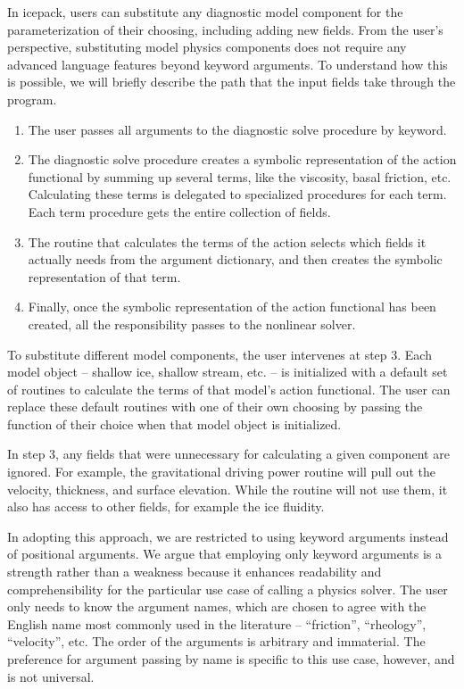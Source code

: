 \documentclass[journal abbreviation, manuscript]{copernicus}
\begin{document}
In icepack, users can substitute any diagnostic model component for the parameterization of their choosing, including adding new fields.
From the user's perspective, substituting model physics components does not require any advanced language features beyond keyword arguments.
To understand how this is possible, we will briefly describe the path that the input fields take through the program.
\begin{enumerate}
    \item The user passes all arguments to the diagnostic solve procedure by keyword.
    \item The diagnostic solve procedure creates a symbolic representation of the action functional by summing up several terms, like the viscosity, basal friction, etc.
        Calculating these terms is delegated to specialized procedures for each term.
        Each term procedure gets the entire collection of fields.
    \item The routine that calculates the terms of the action selects which fields it actually needs from the argument dictionary, and then creates the symbolic representation of that term.
    \item Finally, once the symbolic representation of the action functional has been created, all the responsibility passes to the nonlinear solver.
\end{enumerate}
To substitute different model components, the user intervenes at step 3.
Each model object -- shallow ice, shallow stream, etc. -- is initialized with a default set of routines to calculate the terms of that model's action functional.
The user can replace these default routines with one of their own choosing by passing the function of their choice when that model object is initialized.

In step 3, any fields that were unnecessary for calculating a given component are ignored.
For example, the gravitational driving power routine will pull out the velocity, thickness, and surface elevation.
While the routine will not use them, it also has access to other fields, for example the ice fluidity.

In adopting this approach, we are restricted to using keyword arguments instead of positional arguments.
We argue that employing only keyword arguments is a strength rather than a weakness because it enhances readability and comprehensibility for the particular use case of calling a physics solver.
The user only needs to know the argument names, which are chosen to agree with the English name most commonly used in the literature -- ``friction'', ``rheology'', ``velocity'', etc.
The order of the arguments is arbitrary and immaterial.
The preference for argument passing by name is specific to this use case, however, and is not universal.
\end{document}
